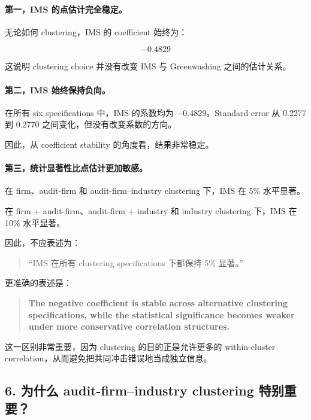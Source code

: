 \documentclass[11pt]{article}
\begin{document}
\paragraph{第一，IMS 的点估计完全稳定。}

无论如何 clustering，IMS 的 coefficient 始终为：

\[
\boxed{-0.4829}
\]

这说明 clustering choice 并没有改变 IMS 与 Greenwashing 之间的估计关系。

\paragraph{第二，IMS 始终保持负向。}

在所有 six specifications 中，IMS 的系数均为 $-0.4829$。Standard error 从 0.2277 到 0.2770 之间变化，但没有改变系数的方向。

因此，从 coefficient stability 的角度看，结果非常稳定。

\paragraph{第三，统计显著性比点估计更加敏感。}

在 firm、audit-firm 和 audit-firm--industry clustering 下，IMS 在 5\% 水平显著。

在 firm + audit-firm、audit-firm + industry 和 industry clustering 下，IMS 在 10\% 水平显著。

因此，不应表述为：

\begin{quote}
“IMS 在所有 clustering specifications 下都保持 5\% 显著。”
\end{quote}

更准确的表述是：

\begin{quote}
\textbf{The negative coefficient is stable across alternative clustering specifications, while the statistical significance becomes weaker under more conservative correlation structures.}
\end{quote}

这一区别非常重要，因为 clustering 的目的正是允许更多的 within-cluster correlation，从而避免把共同冲击错误地当成独立信息。

\subsection{6. 为什么 audit-firm--industry clustering 特别重要？}
\end{document}
